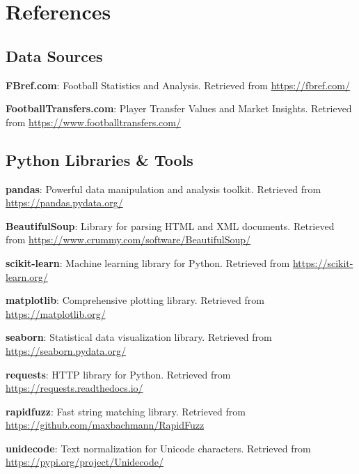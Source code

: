 \documentclass[12pt,a4paper]{report}
\begin{document}
\cleardoublepage  %
\chapter*{References}

\section*{Data Sources}  
    \textbf{FBref.com}: Football Statistics and Analysis. Retrieved from \href{https://fbref.com/}{https://fbref.com/}  

    \textbf{FootballTransfers.com}: Player Transfer Values and Market Insights. Retrieved from \href{https://www.footballtransfers.com/}{https://www.footballtransfers.com/}

\section*{Python Libraries \& Tools}  
    \textbf{pandas}: Powerful data manipulation and analysis toolkit. Retrieved from \href{https://pandas.pydata.org/}{https://pandas.pydata.org/}  

    \textbf{BeautifulSoup}: Library for parsing HTML and XML documents. Retrieved from \href{https://www.crummy.com/software/BeautifulSoup/}{https://www.crummy.com/software/BeautifulSoup/}  

    \textbf{scikit-learn}: Machine learning library for Python. Retrieved from \href{https://scikit-learn.org/}{https://scikit-learn.org/}  

    \textbf{matplotlib}: Comprehensive plotting library. Retrieved from \href{https://matplotlib.org/}{https://matplotlib.org/}  

    \textbf{seaborn}: Statistical data visualization library. Retrieved from \href{https://seaborn.pydata.org/}{https://seaborn.pydata.org/}  

    \textbf{requests}: HTTP library for Python. Retrieved from \href{https://requests.readthedocs.io/}{https://requests.readthedocs.io/}  

    \textbf{rapidfuzz}: Fast string matching library. Retrieved from \href{https://github.com/maxbachmann/RapidFuzz}{https://github.com/maxbachmann/RapidFuzz}  

    \textbf{unidecode}: Text normalization for Unicode characters. Retrieved from \href{https://pypi.org/project/Unidecode/}{https://pypi.org/project/Unidecode/}
\end{document}

